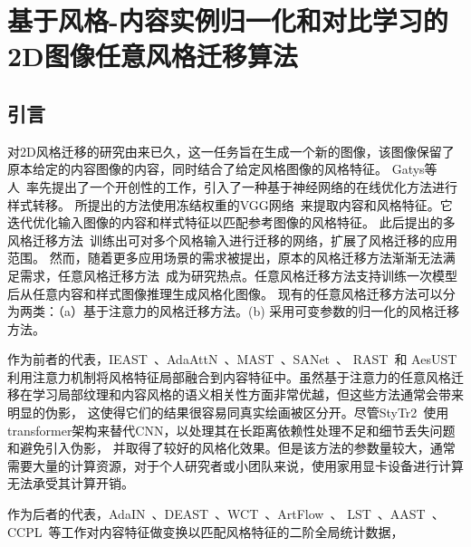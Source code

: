 


\chapter{基于风格-内容实例归一化和对比学习的2D图像任意风格迁移算法}

\section{引言}
对2D风格迁移的研究由来已久，这一任务旨在生成一个新的图像，该图像保留了原本给定的内容图像的内容，同时结合了给定风格图像的风格特征。
Gatys等人~\cite{gatys2016image}率先提出了一个开创性的工作，引入了一种基于神经网络的在线优化方法进行样式转移。
所提出的方法使用冻结权重的VGG网络~\cite{simonyan2015very}来提取内容和风格特征。它迭代优化输入图像的内容和样式特征以匹配参考图像的风格特征。
此后提出的多风格迁移方法~\cite{dumoulin2016learned}训练出可对多个风格输入进行迁移的网络，扩展了风格迁移的应用范围。
然而，随着更多应用场景的需求被提出，原本的风格迁移方法渐渐无法满足需求，任意风格迁移方法~\cite{huang2017arbitrary}成为研究热点。任意风格迁移方法支持训练一次模型后从任意内容和样式图像推理生成风格化图像。
现有的任意风格迁移方法可以分为两类：（a）基于注意力的风格迁移方法。(b) 采用可变参数的归一化的风格迁移方法。
\par 作为前者的代表，IEAST~\cite{chen2021artistic}、AdaAttN~\cite{liu2021adaattn}、MAST~\cite{deng2020arbitrary}、SANet~\cite{park2019arbitrary}、
RAST~\cite{ma2023rast}和 AesUST~\cite{wang2022aesust}
利用注意力机制将风格特征局部融合到内容特征中。虽然基于注意力的任意风格迁移在学习局部纹理和内容风格的语义相关性方面非常优越，但这些方法通常会带来明显的伪影，
这使得它们的结果很容易同真实绘画被区分开。尽管StyTr2~\cite{deng2022stytr2}使用transformer架构来替代CNN，以处理其在长距离依赖性处理不足和细节丢失问题和避免引入伪影，
并取得了较好的风格化效果。但是该方法的参数量较大，通常需要大量的计算资源，对于个人研究者或小团队来说，使用家用显卡设备进行计算无法承受其计算开销。
\par 作为后者的代表，AdaIN~\cite{huang2017arbitrary}、DEAST~\cite{zhang2022domain}、WCT~\cite{li2017universal}、ArtFlow~\cite{an2021artflow}、
LST~\cite{li2019learning}、AAST~\cite{hu2020aesthetic}、CCPL~\cite{wu2022ccpl}等工作对内容特征做变换以匹配风格特征的二阶全局统计数据，
